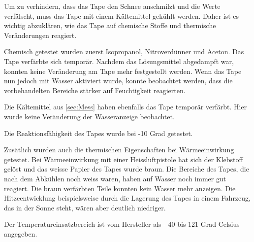 
 Um zu verhindern, dass das Tape den Schnee anschmilzt und die Werte verfälscht, muss das Tape mit einem Kältemittel gekühlt werden. Daher ist es wichtig abzuklären, wie das Tape auf chemische Stoffe und thermische Veränderungen reagiert.

Chemisch getestet wurden zuerst Isopropanol, Nitroverdünner und Aceton.  Das Tape verfärbte sich temporär. Nachdem das Lösungsmittel abgedampft war, konnten keine Veränderung am Tape mehr festgestellt werden. Wenn das Tape nun jedoch mit Wasser aktiviert wurde, konnte beobachtet werden, dass die vorbehandelten Bereiche stärker auf Feuchtigkeit  reagierten. 


Die Kältemittel aus \ref{sec:Mess} haben ebenfalls das Tape temporär verfärbt. Hier wurde keine Veränderung der Wasseranzeige beobachtet.

Die Reaktionsfähigkeit des Tapes wurde bei -10 Grad getestet.

Zusätlich wurden auch die thermischen Eigenschaften bei Wärmeeinwirkung getestet. Bei Wärmeeinwirkung mit einer Heissluftpistole hat sich der Klebstoff gelöst und das weisse Papier des Tapes wurde braun. Die Bereiche des Tapes, die nach dem Abkühlen noch weiss waren, haben auf Wasser noch immer gut reagiert. Die braun verfärbten Teile konnten kein Wasser mehr anzeigen. Die Hitzeentwicklung beispielsweise durch die Lagerung des Tapes in einem Fahrzeug, das in der Sonne steht, wären aber deutlich niedriger.

Der Temperatureinsatzbereich ist vom Hersteller als - 40 bis 121 Grad Celsius angegeben.
